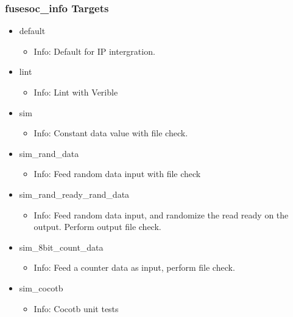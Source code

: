 \subsubsection{fusesoc\_info Targets}
\begin{itemize}
\item default
	\begin{itemize}
	\item[$\space$] Info: Default for IP intergration.
	\end{itemize}
\item lint
	\begin{itemize}
	\item[$\space$] Info: Lint with Verible
	\end{itemize}
\item sim
	\begin{itemize}
	\item[$\space$] Info: Constant data value with file check.
	\end{itemize}
\item sim\_rand\_data
	\begin{itemize}
	\item[$\space$] Info: Feed random data input with file check
	\end{itemize}
\item sim\_rand\_ready\_rand\_data
	\begin{itemize}
	\item[$\space$] Info: Feed random data input, and randomize the read ready on the output. Perform output file check.
	\end{itemize}
\item sim\_8bit\_count\_data
	\begin{itemize}
	\item[$\space$] Info: Feed a counter data as input, perform file check.
	\end{itemize}
\item sim\_cocotb
	\begin{itemize}
	\item[$\space$] Info: Cocotb unit tests
	\end{itemize}
\end{itemize}
